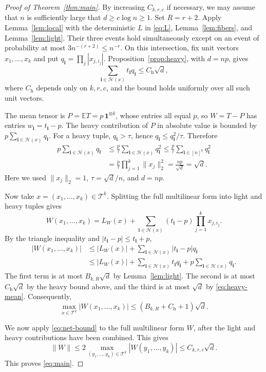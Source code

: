 \documentclass[11pt,reqno]{amsart}
\numberwithin{equation}{section}
\theoremstyle{definition}
\theoremstyle{remark}
\newcommand{\E}{\mathbb E}
\newcommand{\one}{\mathbf 1}
\begin{document}
\begin{proof}[Proof of Theorem~\ref{thm:main}]
By increasing $C_{k,r,c}$ if necessary,
we may assume that $n$ is sufficiently large that
$d\ge c\log n\ge1$. Set $R=r+2$.
Apply Lemma~\ref{lem:local} with the deterministic $L$ in
\eqref{eq:L}, Lemma~\ref{lem:fibers}, and Lemma~\ref{lem:light}.
Their three events hold simultaneously except on an event of
probability at most
$3n^{-(r+2)}\le n^{-r}$.
On this intersection, fix unit vectors $x_1,\ldots,x_k$ and put
$q_{\mathbf i}=\prod_j|x_{j,i_j}|$.
Proposition~\ref{prop:heavy}, with $d=np$, gives
\[
 \sum_{\mathbf i\in\mathcal H(x)}t_{\mathbf i}q_{\mathbf i}
 \le C_{\mathrm h}\sqrt d,
\]
where $C_{\mathrm h}$ depends only on $k,r,c$, and the bound holds
uniformly over all such unit vectors.

The mean tensor is $P=\E T=p\,\one^{\otimes k}$, whose entries all
equal $p$, so $W=T-P$ has entries $w_{\mathbf i}=t_{\mathbf i}-p$.
The heavy contribution of $P$ in absolute value is bounded by
$p\sum_{\mathbf i\in\mathcal H(x)}q_{\mathbf i}$.
For a heavy tuple, $q_{\mathbf i}>\tau$, hence
$q_{\mathbf i}\le q_{\mathbf i}^2/\tau$. Therefore
\begin{equation}\label{eq:heavy-mean}
\begin{aligned}
 p\sum_{\mathbf i\in\mathcal H(x)}q_{\mathbf i}
 &\le\frac p\tau\sum_{\mathbf i\in\mathcal H(x)}q_{\mathbf i}^2
 \le\frac p\tau\sum_{\mathbf i\in[n]^k}q_{\mathbf i}^2\\
 &=\frac p\tau\prod_{j=1}^k\|x_j\|_2^2
 =\frac{np}{\sqrt d}=\sqrt d.
\end{aligned}
\end{equation}
Here we used $\|x_j\|_2=1$, $\tau=\sqrt d/n$, and $d=np$.

Now take $x=(x_1,\ldots,x_k)\in\mathcal T^k$.
Splitting the full multilinear form into light and heavy tuples gives
\[
 W(x_1,\ldots,x_k)
 =L_W(x)+\sum_{\mathbf i\in\mathcal H(x)}
                 (t_{\mathbf i}-p)\prod_{j=1}^k x_{j,i_j}.
\]
By the triangle inequality and $|t_{\mathbf i}-p|\le t_{\mathbf i}+p$,
\begin{align*}
 |W(x_1,\ldots,x_k)|
 &\le |L_W(x)|+\sum_{\mathbf i\in\mathcal H(x)}|t_{\mathbf i}-p|q_{\mathbf i}\\
 &\le |L_W(x)|
       +\sum_{\mathbf i\in\mathcal H(x)}t_{\mathbf i}q_{\mathbf i}
       +p\sum_{\mathbf i\in\mathcal H(x)}q_{\mathbf i}.
\end{align*}
The first term is at most $B_{k,R}\sqrt d$ by Lemma~\ref{lem:light}.
The second is at most $C_{\mathrm h}\sqrt d$ by the heavy bound above,
and the third is at most $\sqrt d$ by \eqref{eq:heavy-mean}. Consequently,
\[
 \max_{x\in\mathcal T^k}|W(x_1,\ldots,x_k)|
 \le (B_{k,R}+C_{\mathrm h}+1)\sqrt d.
\]

We now apply \eqref{eq:net-bound} to the full multilinear form $W$,
after the light and heavy contributions have been combined. This gives
\[
 \|W\|\le
       2\max_{(y_1,\ldots,y_k)\in\mathcal T^k}
            |W(y_1,\ldots,y_k)|\le C_{k,r,c}\sqrt d.
\]
This proves \eqref{eq:main}.
\end{proof}
\end{document}
